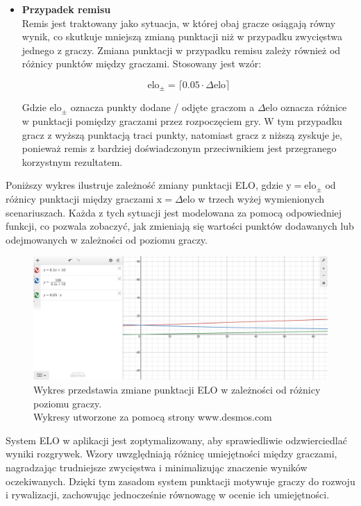 \documentclass[12pt,a4paper]{article}
\begin{document}
\begin{itemize}
    \item \textbf{Przypadek remisu}\\
    Remis jest traktowany jako sytuacja, w której obaj gracze osiągają równy wynik, co skutkuje mniejszą zmianą punktacji niż w przypadku zwycięstwa jednego z graczy. Zmiana punktacji w przypadku remisu zależy również od różnicy punktów między graczami. Stosowany jest wzór:

    \[ \text{elo}_{\pm} = \lceil 0.05 \cdot \Delta \text{elo} \rceil \]

    Gdzie $ \text{elo}_{\pm} $ oznacza punkty dodane / odjęte graczom a $ \Delta \text{elo} $ oznacza różnice w punktacji pomiędzy graczami przez rozpoczęciem gry.     W tym przypadku gracz z wyższą punktacją traci punkty, natomiast gracz z niższą zyskuje je, ponieważ remis z bardziej doświadczonym przeciwnikiem jest przegranego korzystnym rezultatem.
\end{itemize}

\newpage


\noindent
Poniższy wykres ilustruje zależność zmiany punktacji ELO, gdzie $ \text{y} = \text{elo}_{\pm} $ od różnicy punktacji między graczami $ \text{x} = \Delta \text{elo} $  w trzech wyżej wymienionych scenariuszach. Każda z tych sytuacji jest modelowana za pomocą odpowiedniej funkcji, co pozwala zobaczyć, jak zmieniają się wartości punktów dodawanych lub odejmowanych w zależności od poziomu graczy.

\vspace{1cm}
\begin{figure}[h!]
    \centering
    \includegraphics[width=1\textwidth]{images/graf_elo_calc.png}
    \caption{Wykres przedstawia zmiane punktacji ELO w zależności od różnicy poziomu graczy. \\ Wykresy utworzone za pomocą strony www.desmos.com}
\end{figure}
\vspace{1cm}

\noindent
System ELO w aplikacji jest zoptymalizowany, aby sprawiedliwie odzwierciedlać wyniki rozgrywek. Wzory uwzględniają różnicę umiejętności między graczami, nagradzając trudniejsze zwycięstwa i minimalizując znaczenie wyników oczekiwanych. Dzięki tym zasadom system punktacji motywuje graczy do rozwoju i rywalizacji, zachowując jednocześnie równowagę w ocenie ich umiejętności.
\\\\
\end{document}
